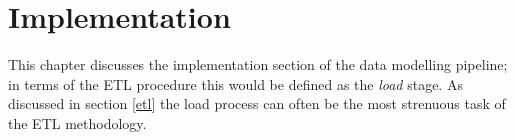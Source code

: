 \chapter{Implementation}\label{implementation}
This chapter discusses the implementation section of the data modelling pipeline; in terms of the ETL procedure this would be defined as the \textit{load} stage. As discussed in section \ref{etl} the load process can often be the most strenuous task of the ETL methodology.
